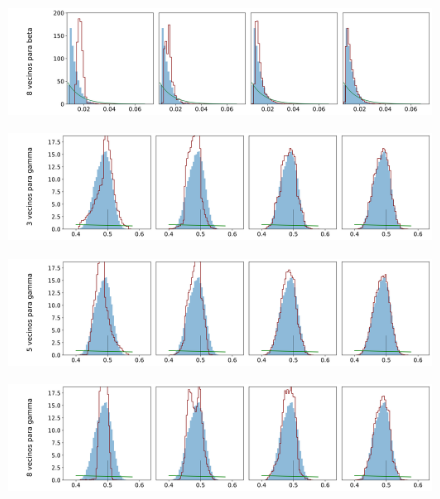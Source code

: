 \begin{figure}[H] 
    \centering 
    \includegraphics[width = 17 cm ]{img/Exp_Central_SIR_Sigma/Figuras/Generales/Convergencia_theta1_3_SIR_sigma.png} 
\end{figure} 

\begin{figure}[H] 
    \centering 
    \includegraphics[width = 17 cm ]{img/Exp_Central_SIR_Sigma/Figuras/Generales/Convergencia_theta2_1_SIR_sigma.png} 
\end{figure} 

\begin{figure}[H] 
    \centering 
    \includegraphics[width = 17 cm ]{img/Exp_Central_SIR_Sigma/Figuras/Generales/Convergencia_theta2_2_SIR_sigma.png} 
\end{figure} 

\begin{figure}[H] 
    \centering 
    \includegraphics[width = 17 cm ]{img/Exp_Central_SIR_Sigma/Figuras/Generales/Convergencia_theta2_3_SIR_sigma.png} 
\end{figure} 



















